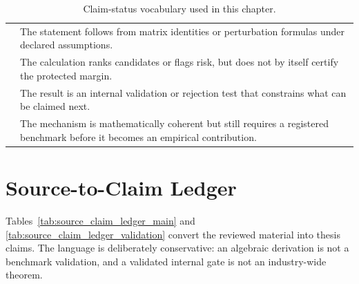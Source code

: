 \begin{table}[ht]
\centering
\caption{Claim-status vocabulary used in this chapter.}
\label{tab:claim_status_vocabulary}
\begin{tabular}{L{0.19\textwidth}L{0.67\textwidth}}
\toprule
{}
 & \\
\midrule
{} &
The statement follows from matrix identities or perturbation formulas under
declared assumptions.\\
 &
The calculation ranks candidates or flags risk, but does not by itself certify
the protected margin.\\
 &
The result is an internal validation or rejection test that constrains what can
be claimed next.\\
 &
The mechanism is mathematically coherent but still requires a registered
benchmark before it becomes an empirical contribution.\\
\bottomrule
\end{tabular}
\end{table}

\FloatBarrier

\section{Source-to-Claim Ledger}

Tables~\ref{tab:source_claim_ledger_main} and
\ref{tab:source_claim_ledger_validation} convert the reviewed material into
thesis claims. The language is deliberately conservative: an algebraic
derivation is not a benchmark validation, and a validated internal gate is not
an industry-wide theorem.

